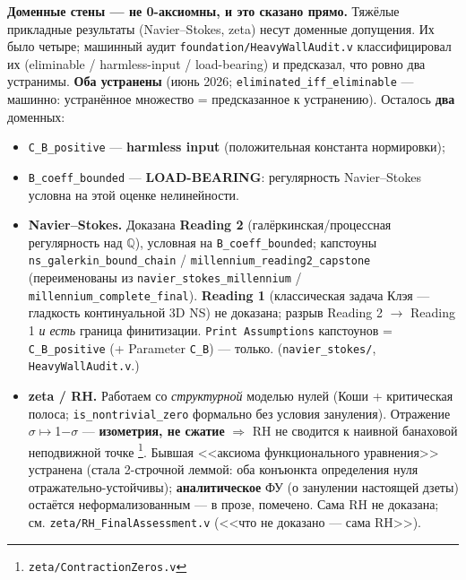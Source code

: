 \documentclass[11pt,a4paper]{article}
\begin{document}
\textbf{Доменные стены --- не 0-аксиомны, и это сказано прямо.} Тяжёлые прикладные результаты (Navier--Stokes, zeta) несут доменные допущения. Их было четыре; машинный аудит \texttt{foundation/\allowbreak{}Heavy\allowbreak{}Wall\allowbreak{}Audit.v} классифицировал их (eliminable / harmless-input / load-bearing) и предсказал, что ровно два устранимы. \textbf{Оба устранены} (июнь 2026; \texttt{eliminated\_\allowbreak{}iff\_\allowbreak{}eliminable} --- машинно: устранённое множество = предсказанное к устранению). Осталось \textbf{два} доменных:
\begin{itemize}
\item \texttt{C\_\allowbreak{}B\_\allowbreak{}positive} --- \textbf{harmless input} (положительная константа нормировки);
\item \texttt{B\_\allowbreak{}coeff\_\allowbreak{}bounded} --- \textbf{LOAD-BEARING}: регулярность Navier--Stokes условна на этой оценке нелинейности.
\end{itemize}

\begin{itemize}
\item \textbf{Navier--Stokes.} Доказана \textbf{Reading 2} (галёркинская/процессная регулярность над $\mathbb{Q}$), условная на \texttt{B\_\allowbreak{}coeff\_\allowbreak{}bounded}; капстоуны \texttt{ns\_\allowbreak{}galerkin\_\allowbreak{}bound\_\allowbreak{}chain} / \texttt{millennium\_\allowbreak{}reading2\_\allowbreak{}capstone} (переименованы из \texttt{navier\_\allowbreak{}stokes\_\allowbreak{}millennium} / \texttt{millennium\_\allowbreak{}complete\_\allowbreak{}final}). \textbf{Reading 1} (классическая задача Клэя --- гладкость континуальной 3D NS) не доказана; разрыв Reading 2 $\to$ Reading 1 \emph{и есть} граница финитизации. \texttt{Print Assumptions} капстоунов = \texttt{C\_\allowbreak{}B\_\allowbreak{}positive} (+ Parameter \texttt{C\_\allowbreak{}B}) --- только. (\texttt{navier\_\allowbreak{}stokes/\allowbreak{}}, \texttt{Heavy\allowbreak{}Wall\allowbreak{}Audit.v}.)
\item \textbf{zeta / RH.} Работаем со \emph{структурной} моделью нулей (Коши + критическая полоса; \texttt{is\_\allowbreak{}nontrivial\_\allowbreak{}zero} формально без условия зануления). Отражение $\sigma$$\mapsto$1$-$$\sigma$ --- \textbf{изометрия, не сжатие} $\Longrightarrow$ RH не сводится к наивной банаховой неподвижной точке \footnote{\texttt{zeta/\allowbreak{}Contraction\allowbreak{}Zeros.v}}. Бывшая <<аксиома функционального уравнения>> устранена (стала 2-строчной леммой: оба конъюнкта определения нуля отражательно-устойчивы); \textbf{аналитическое} ФУ (о занулении настоящей дзеты) остаётся неформализованным --- в прозе, помечено. Сама RH не доказана; см. \texttt{zeta/\allowbreak{}RH\_\allowbreak{}Final\allowbreak{}Assessment.v} (<<что не доказано --- сама RH>>).
\end{itemize}
\end{document}
